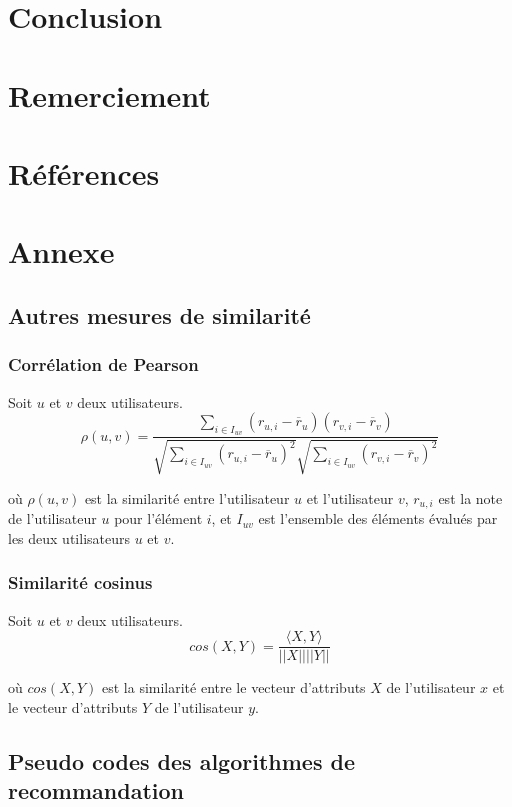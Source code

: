 \documentclass[11pt]{article}
\begin{document}
\newpage
\section{Conclusion}

\newpage
\section{Remerciement}

\newpage
\section{Références}

\newpage
\section{Annexe}
\subsection{Autres mesures de similarité}
\subsubsection{Corrélation de Pearson}
Soit $u$ et $v$ deux utilisateurs. 
\begin{equation}
\rho(u, v) = \frac{\sum_{i \in I_{uv}} (r_{u,i} - \overline{r}_u)(r_{v,i} - \overline{r}_v)}{\sqrt{\sum_{i \in I_{uv}} (r_{u,i} - \overline{r}_u)^2}\sqrt{\sum_{i \in I_{uv}} (r_{v,i} - \overline{r}_v)^2}}
\end{equation}

où $\rho(u, v)$ est la similarité entre l'utilisateur $u$ et l'utilisateur $v$, $r_{u,i}$ est la note de l'utilisateur $u$ pour l'élément $i$, et $I_{uv}$ est l'ensemble des éléments évalués par les deux utilisateurs $u$ et $v$.

\subsubsection{Similarité cosinus}
Soit $u$ et $v$ deux utilisateurs. 
\begin{equation}
cos(X, Y) = \frac{\langle X, Y \rangle}{||X|| ||Y||}
\end{equation}

où $cos(X, Y)$ est la similarité entre le vecteur d'attributs $X$ de l'utilisateur $x$ et le vecteur d'attributs $Y$ de l'utilisateur $y$.


\newpage
\subsection{Pseudo codes des algorithmes de recommandation}
\label{annexe}
\end{document}
